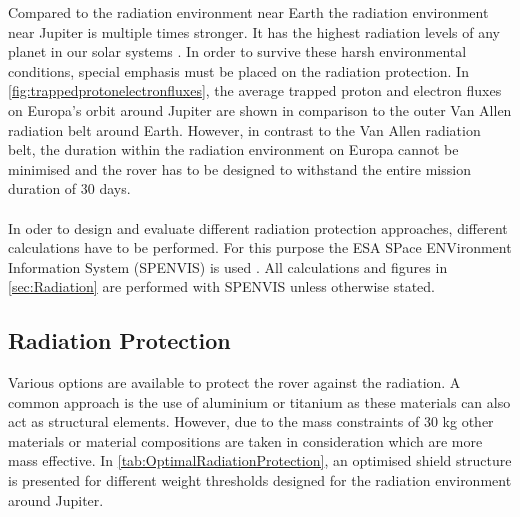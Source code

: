Compared to the radiation environment near Earth the radiation environment near Jupiter is multiple times stronger. It has the highest radiation levels of any planet in our solar systems \cite{Platzhalter}. In order to survive these harsh environmental conditions, special emphasis must be placed on the radiation protection. In \autoref{fig:trappedprotonelectronfluxes}, the average trapped proton and electron fluxes on Europa's orbit around Jupiter are shown in comparison to the outer Van Allen radiation belt around Earth. However, in contrast to the Van Allen radiation belt, the duration within the radiation environment on Europa cannot be minimised and the rover has to be designed to withstand the entire mission duration of 30 days. \\ \\
In oder to design and evaluate different radiation protection approaches, different calculations have to be performed. For this purpose the ESA SPace ENVironment Information System (SPENVIS) is used \cite{Platzhalter}. All calculations and figures in \autoref{sec:Radiation} are performed with SPENVIS unless otherwise stated.

\subsection{Radiation Protection}

\label{subsec:RadiationProtection}

Various options are available to protect the rover against the radiation. A common approach is the use of aluminium or titanium as these materials can also act as structural elements. However, due to the mass constraints of 30 kg other materials or material compositions are taken in consideration which are more mass effective. In \autoref{tab:OptimalRadiationProtection}, an optimised shield structure is presented for different weight thresholds designed for the radiation environment around Jupiter.


